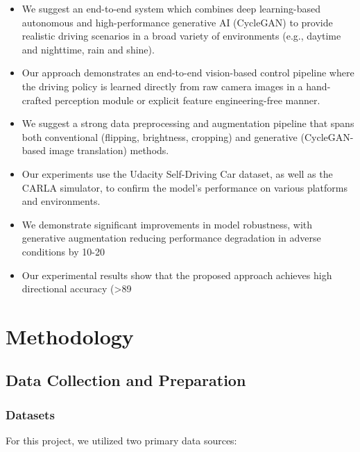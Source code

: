 \documentclass[pdflatex,sn-mathphys-num]{sn-jnl}%
\theoremstyle{thmstyleone}%
\theoremstyle{thmstyletwo}%
\theoremstyle{thmstylethree}%
\begin{document}
\begin{itemize} 
\item We suggest an end-to-end system which combines deep learning-based autonomous and high-performance generative AI (CycleGAN) to provide realistic driving scenarios in a broad variety of environments (e.g., daytime and nighttime, rain and shine).

\item Our approach demonstrates an end-to-end vision-based control pipeline where the driving policy is learned directly from raw camera images in a hand-crafted perception module or explicit feature engineering-free manner.

\item We suggest a strong data preprocessing and augmentation pipeline that spans both conventional (flipping, brightness, cropping) and generative (CycleGAN-based image translation) methods.

\item Our experiments use the Udacity Self-Driving Car dataset, as well as the CARLA simulator, to confirm the model's performance on various platforms and environments.

\item We demonstrate significant improvements in model robustness, with generative augmentation reducing performance degradation in adverse conditions by 10-20%

\item Our experimental results show that the proposed approach achieves high directional accuracy (>89%
\end{itemize}

\section{Methodology}\label{sec2}

\subsection{Data Collection and Preparation}
\subsubsection{Datasets}
For this project, we utilized two primary data sources:
\end{document}
